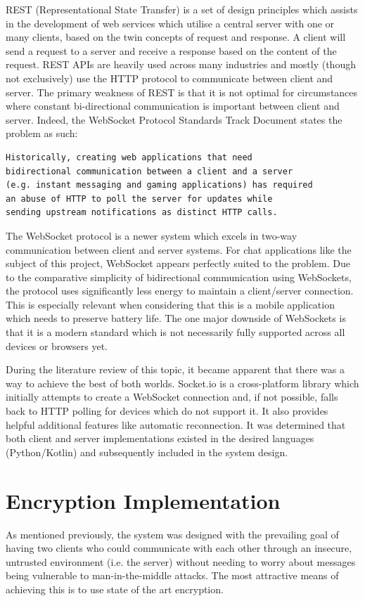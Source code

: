 \documentclass{mproj}
\begin{document}
REST (Representational State Transfer) is a set of design principles which assists in the development of web services which utilise a central server with one or many clients, based on the twin concepts of request and response. A client will send a request to a server and receive a response based on the content of the request. REST APIs are heavily used across many industries and mostly (though not exclusively) use the HTTP protocol to communicate between client and server. The primary weakness of REST is that it is not optimal for circumstances where constant bi-directional communication is important between client and server. Indeed, the WebSocket Protocol Standards Track Document\cite{fette2011websocket} states the problem as such:

\begin{verbatim}
Historically, creating web applications that need 
bidirectional communication between a client and a server 
(e.g. instant messaging and gaming applications) has required 
an abuse of HTTP to poll the server for updates while
sending upstream notifications as distinct HTTP calls.
\end{verbatim}

The WebSocket protocol is a newer system which excels in two-way communication between client and server systems. For chat applications like the subject of this project, WebSocket appears perfectly suited to the problem.
Due to the comparative simplicity of bidirectional communication using WebSockets, the protocol uses significantly less energy\cite{herwig2015assessment} to maintain a client/server connection. This is especially relevant when considering that this is a mobile application which needs to preserve battery life. 
The one major downside of WebSockets is that it is a modern standard which is not necessarily fully supported across all devices or browsers yet.

During the literature review of this topic, it became apparent that there was a way to achieve the best of both worlds. Socket.io\cite{rai2013socket} is a cross-platform library which initially attempts to create a WebSocket connection and, if not possible, falls back to HTTP polling for devices which do not support it. It also provides helpful additional features like automatic reconnection. It was determined that both client and server implementations existed in the desired languages (Python/Kotlin) and subsequently included in the system design.

\section{Encryption Implementation}\label{encryption}
As mentioned previously, the system was designed with the prevailing goal of having two clients who could communicate with each other through an insecure, untrusted environment (i.e. the server) without needing to worry about messages being vulnerable to man-in-the-middle attacks\cite{mallik2019man}. The most attractive means of achieving this is to use state of the art encryption.
\end{document}
